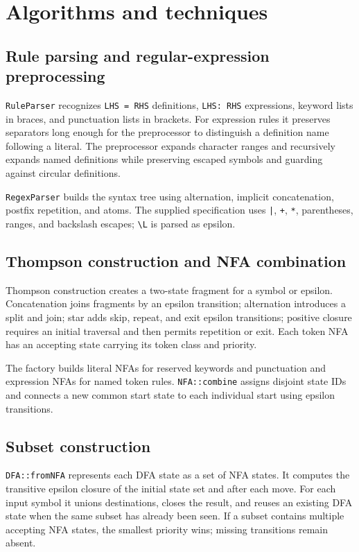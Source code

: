 \documentclass[11pt,a4paper]{article}
\newcommand{\code}[1]{\texttt{#1}}
\begin{document}
\section{Algorithms and techniques}

\subsection{Rule parsing and regular-expression preprocessing}

\code{RuleParser} recognizes \code{LHS = RHS} definitions,
\code{LHS: RHS} expressions, keyword lists in braces, and punctuation
lists in brackets. For expression rules it preserves separators long
enough for the preprocessor to distinguish a definition name following a
literal. The preprocessor expands character ranges and recursively
expands named definitions while preserving escaped symbols and guarding
against circular definitions.

\code{RegexParser} builds the syntax tree using alternation, implicit
concatenation, postfix repetition, and atoms. The supplied specification
uses \code{|}, \code{+}, \code{*}, parentheses, ranges, and backslash
escapes; \code{\textbackslash L} is parsed as epsilon.

\subsection{Thompson construction and NFA combination}

Thompson construction creates a two-state fragment for a symbol or
epsilon. Concatenation joins fragments by an epsilon transition;
alternation introduces a split and join; star adds skip, repeat, and exit
epsilon transitions; positive closure requires an initial traversal and
then permits repetition or exit. Each token NFA has an accepting state
carrying its token class and priority.

The factory builds literal NFAs for reserved keywords and punctuation
and expression NFAs for named token rules. \code{NFA::combine} assigns
disjoint state IDs and connects a new common start state to each
individual start using epsilon transitions.

\subsection{Subset construction}

\code{DFA::fromNFA} represents each DFA state as a set of NFA states.
It computes the transitive epsilon closure of the initial state set and
after each move. For each input symbol it unions destinations, closes
the result, and reuses an existing DFA state when the same subset has
already been seen. If a subset contains multiple accepting NFA states,
the smallest priority wins; missing transitions remain absent.
\end{document}
